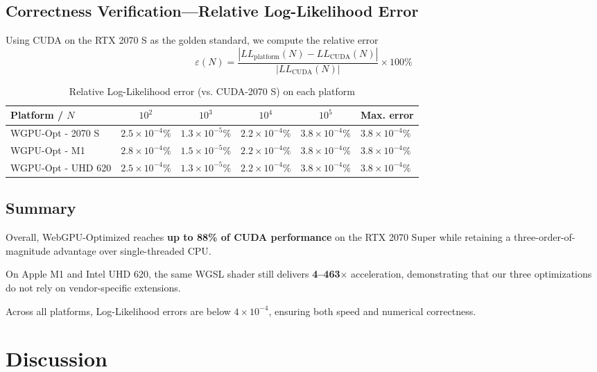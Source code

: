 \documentclass[12pt]{report}
\begin{document}
\section{Correctness Verification—Relative Log-Likelihood Error}
Using CUDA on the RTX 2070 S as the golden standard, we compute the relative error
\[
\varepsilon(N) = \frac{|LL_{\text{platform}}(N) - LL_{\text{CUDA}}(N)|}{|LL_{\text{CUDA}}(N)|} \times 100\%
\]

\begin{table}[h]
    \centering
    \begin{tabularx}{\textwidth}{|X|c|c|c|c|X|}
        \hline
        Platform / $N$ & $10^2$ & $10^3$ & $10^4$ & $10^5$ & Max. error \\
        \hline
        WGPU-Opt - 2070 S & $2.5 \times 10^{-4}\%$ & $1.3 \times 10^{-5}\%$ & $2.2 \times 10^{-4}\%$ & $3.8 \times 10^{-4}\%$ & \textbf{$3.8 \times 10^{-4}\%$} \\
        WGPU-Opt - M1 & $2.8 \times 10^{-4}\%$ & $1.5 \times 10^{-5}\%$ & $2.2 \times 10^{-4}\%$ & $3.8 \times 10^{-4}\%$ & $3.8 \times 10^{-4}\%$ \\
        WGPU-Opt - UHD 620 & $2.5 \times 10^{-4}\%$ & $1.3 \times 10^{-5}\%$ & $2.2 \times 10^{-4}\%$ & $3.8 \times 10^{-4}\%$ & $3.8 \times 10^{-4}\%$ \\
        \hline
    \end{tabularx}
    \caption{Relative Log-Likelihood error (vs. CUDA-2070 S) on each platform}
    \label{tab:likelihood_error}
\end{table}

\section{Summary}
Overall, WebGPU-Optimized reaches \textbf{up to 88\% of CUDA performance} on the RTX 2070 Super while retaining a three-order-of-magnitude advantage over single-threaded CPU.

On Apple M1 and Intel UHD 620, the same WGSL shader still delivers \textbf{4–463$\times$} acceleration, demonstrating that our three optimizations do not rely on vendor-specific extensions.

Across all platforms, Log-Likelihood errors are below $4 \times 10^{-4}$, ensuring both speed and numerical correctness.

\chapter{Discussion}
\end{document}

